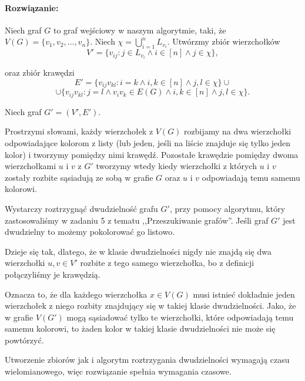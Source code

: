 \paragraph{Rozwiązanie:} 

Niech graf $G$ to graf wejściowy w naszym algorytmie, taki, że
$V(G) = \{v_1, v_2, \ldots, v_n\}$. 
Niech $\chi = \bigcup_{i = 1}^n L_{v_i}$.
Utwórzmy zbiór wierzchołków
\[V' = \{v_{ij} : j \in L_{v_i} \land i \in [n] \land j \in \chi\},\]

oraz zbiór krawędzi 
\[E' = \{v_{ij}v_{kl} : i = k \land i,k \in [n] \land j, l \in \chi\} \cup 
\]
\[\cup
\{v_{ij}v_{kl} : j = l \land v_iv_k \in E(G) \land i,k \in [n] \land j, l \in \chi\}.\]

Niech graf $G' = (V', E')$. 

Prostrzymi słowami, każdy wierzchołek z $V(G)$ rozbijamy na dwa wierzchołki odpowiadające kolorom z listy (lub jeden, jeśli na liście znajduje się tylko jeden kolor) i tworzymy pomiędzy 
nimi krawędź. Pozostałe krawędzie pomiędzy dwoma wierzchołkami
$u$ i $v$ z $G'$ tworzymy wtedy kiedy wierzchołki 
z których $u$ i $v$ zostały rozbite sąsiadują ze sobą
w grafie $G$ oraz $u$ i $v$ odpowiadają temu samemu kolorowi.

Wystarczy roztrzygnąć dwudzielność 
grafu $G'$, przy pomocy algorytmu, który zastosowaliśmy w zadaniu 5 z tematu ,,Przeszukiwanie grafów''. Jeśli graf $G'$ jest dwudzielny
to możemy pokolorować go listowo.

Dzieje się tak, dlatego, że w klasie dwudzielności nigdy
nie znajdą się dwa wierzchołki $u, v \in V'$ rozbite z tego samego wierzchołka, bo z definicji połączyliśmy je krawędzią.

Oznacza to, że dla każdego wierzchołka $x \in V(G)$ musi
istnieć dokładnie jeden wierzchołek z niego rozbity znajdujący się w takiej klasie dwudzielności. Jako, że w grafie $V(G')$
mogą sąsiadować tylko te wierzchołki, które odpowiadają temu samemu kolorowi, to żaden kolor w takiej klasie dwudzielności nie może się powtórzyć.

Utworzenie zbiorów jak i algorytm roztrzygania dwudzielności wymagają czasu wielomianowego, więc rozwiązanie spełnia wymagania czasowe.

